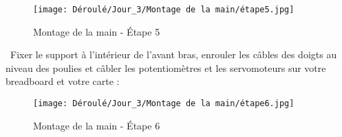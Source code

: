 \begin{flushleft}
\begin{figure}[!h]
    \centering
    \texttt{[image: Déroulé/Jour\_3/Montage de la main/étape5.jpg]}
    \caption[\'Etape 5]{Montage de la main - \'Etape 5}
    \label{fig:my_label}
\end{figure}

\newpage

\textbullet \, Fixer le support à l'intérieur de l'avant bras, enrouler les câbles des doigts au niveau des poulies et câbler les potentiomètres et les servomoteurs sur votre breadboard et votre carte :

\begin{figure}[!h]
    \centering
    \texttt{[image: Déroulé/Jour\_3/Montage de la main/étape6.jpg]}
    \caption[\'Etape 6]{Montage de la main - \'Etape 6}
    \label{fig:my_label}
\end{figure}

\end{flushleft}